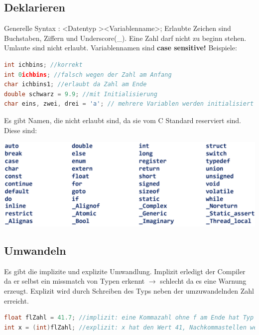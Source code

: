 \subsection{Deklarieren}

Generelle Syntax : \textless Datentyp \textgreater \textless Variablenname\textgreater;\newline
Erlaubte Zeichen sind Buchstaben, Ziffern und Underscore(\_). Eine Zahl darf nicht zu beginn stehen. Umlaute sind nicht erlaubt. Variablennamen sind \textbf{case sensitive!}\newline
Beispiele:

\begin{lstlisting}[language = c]
int ichbins; //korrekt
int 0ichbins; //falsch wegen der Zahl am Anfang
char ichbins1; //erlaubt da Zahl am Ende
double schwarz = 9.9; //mit Initialisierung
char eins, zwei, drei = 'a'; // mehrere Variablen werden initialisiert aber nur "drei" wird mit 'a' initialisiert 
\end{lstlisting}

Es gibt Namen, die nicht erlaubt sind, da sie vom C Standard reserviert sind. Diese sind:\newline

\begin{center}
    \includegraphics[width=1\columnwidth]{Pictures/illegal_variable_names.png}    
\end{center}

\subsection{Umwandeln}

Es gibt die implizite und explizite Umwandlung. Implizit erledigt der Compiler da er selbst ein missmatch von Typen erkennt $\rightarrow$ schlecht da es eine Warnung erzeugt.\newline
Explizit wird durch Schreiben des Typs neben der umzuwandelnden Zahl erreicht.

\begin{lstlisting}[language = c]
float flZahl = 41.7; //implizit: eine Kommazahl ohne f am Ende hat Typ double
int x = (int)flZahl; //explizit: x hat den Wert 41, Nachkommastellen werden abgeschnitten!
\end{lstlisting}

